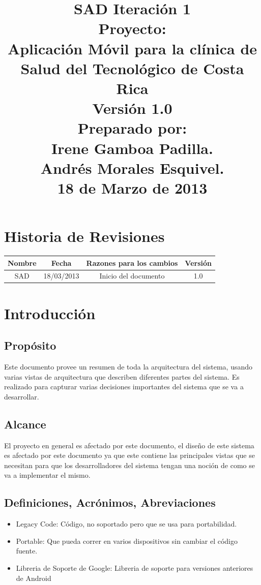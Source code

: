 \documentclass[12pt]{article}
\title{\begin{flushright}\textbf{SAD Iteraci\'on 1} \\[0.7in] 
		Proyecto: \\[0.2in]
		\textbf{Aplicaci\'on M\'ovil para la cl\'inica de Salud del Tecnol\'ogico de Costa Rica}\\[0.7in]
		Versi\'on 1.0 \\[0.7in]
		Preparado por: \\[0.2in]
		\textbf{Irene Gamboa Padilla.\\
		Andr\'es Morales Esquivel.} \\[0.7in]
		18 de Marzo de 2013
		\end{flushright}}
\author{}
\date{}
\begin{document}
\maketitle
\newpage
\renewcommand{\contentsname}{Tabla de Contenido}
{\footnotesize
	\tableofcontents
}
\section{Historia de Revisiones}

\begin{center}
	\begin{tabular}{|c|c|c|c|}
	\hline
		\textbf{Nombre} & \textbf{Fecha} & \textbf{Razones para los cambios} & \textbf{Versi\'on}\\
	\hline
		SAD & 18/03/2013 & Inicio del documento & 1.0\\
	\hline
	\end{tabular}
\end{center}

\newpage
\section{Introducci\'on}

\subsection{Prop\'osito}
Este documento provee un resumen de toda la arquitectura del sistema, usando varias vistas de arquitectura que describen diferentes partes del sistema. Es realizado para capturar varias decisiones importantes del sistema que se va a desarrollar.

\subsection{Alcance}
El proyecto en general es afectado por este documento, el dise\~no de este sistema es afectado por este documento ya que este contiene las principales vistas que se necesitan para que los desarrolladores del sistema tengan una noci\'on de como se va a implementar el mismo.

\subsection{Definiciones, Acr\'onimos, Abreviaciones}
\begin{itemize}
	\item{Legacy Code: C\'odigo, no soportado pero que se usa para portabilidad.}
	\item{Portable: Que pueda correr en varios dispositivos sin cambiar el c\'odigo fuente.}
	\item{Libreria de Soporte de Google: Libreria de soporte para versiones anteriores de Android}
\end{itemize}
\end{document}
